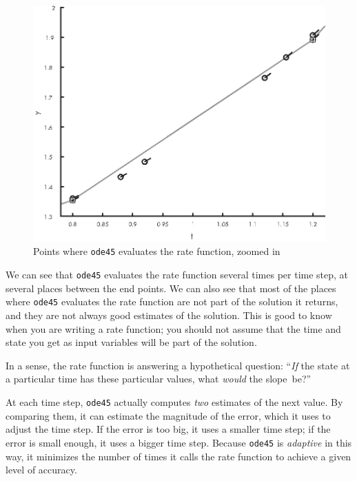 \begin{figure}[h]
\includegraphics[scale=0.90]{images/figure15_02_new.eps}
\caption{Points where \lstinline{ode45} evaluates the rate function, zoomed in}
\label{fig:odeplot2}
\end{figure}

We can see that \lstinline{ode45} evaluates the rate function several times per time step, at several places between the end points.
We can also see that most of the places where \lstinline{ode45} evaluates the rate function are not part of the solution it returns, and they are not always good estimates of the solution.
This is good to know when you are writing a rate function; you should not assume that the time and state you get as input variables will be part of the solution.

In a sense, the rate function is answering a hypothetical question: ``\emph{If} the state at a particular time has these particular values, what \emph{would} the slope~be?''


At each time step, \lstinline{ode45} actually computes \emph{two} estimates of the next value.
By comparing them, it can estimate the magnitude of the error, \linebreak which it uses to adjust the time step.
If the error is too big, it uses a smaller time step; if the error is small enough, it uses a bigger time step.
Because \lstinline{ode45} is \emph{adaptive} in this way, it minimizes the number of times it calls the rate function to achieve a given level of accuracy.

